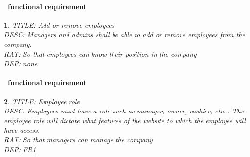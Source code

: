 \documentclass{scrreprt}
\theoremstyle{funreq}
\newtheorem{funreq}{}
\newcommand*{\reqref}[1]{\hyperref[#1]{FR\ref*{#1}}}
\begin{document}
	\paragraph[]{\Subsectionname ~functional requirement }
	\begin{funreq}
		\label{employee_addremove}
		TITLE: Add or remove employees\\
		DESC: Managers and admins shall be able to add or remove employees from the company.  \\
		RAT: So that employees can know their position in the company\\
		DEP: none
	\end{funreq}
	
	\paragraph[]{\Subsectionname ~functional requirement }
	\begin{funreq}
		\label{employee_role}
		TITLE: Employee role\\
		DESC: Employees must have a role such as manager, owner, cashier, etc...  The employee role will dictate what features of the website to which the employee will have access.\\
		RAT: So that managers can manage the company\\
		DEP: \reqref{employee_addremove}
	\end{funreq}

\end{document}
